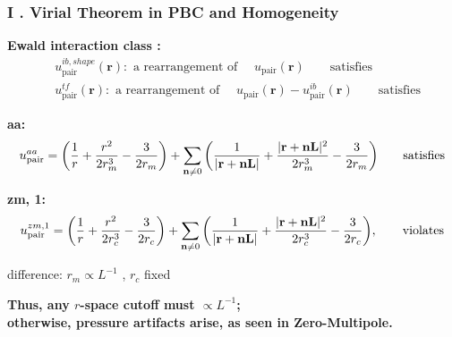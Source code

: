 \documentclass{beamer}
\begin{document}
	\begin{frame}
		\frametitle{I . Virial Theorem in PBC and Homogeneity}    	
		\footnotesize 
		
		\textbf{Ewald interaction class :}
		\begin{align*}
			&u_{\text{pair}}^{ib, shape}(\mathbf{r})  : \text{  a rearrangement of    } \quad   u_{\text{pair}}(\mathbf{r}) \qquad \text{satisfies} \\
			&u_{\text{pair}}^{tf}(\mathbf{r})  : \text{  a rearrangement of    } \quad   u_{\text{pair}}(\mathbf{r}) - u^{ib}_{\text{pair}}(\mathbf{r}) \qquad \text{satisfies}
		\end{align*}
		
		\textbf{aa:}
		\begin{equation*}
			u_{\text{pair}}^{aa} = 
			\bigg{(} \dfrac{1}{r} +  \dfrac{r^2}{2r_m^3} - \dfrac{3}{2r_m}\bigg{)} + \sum_{\mathbf{n} \ne 0 }\bigg{(}\dfrac{1}{|\mathbf{r} + \mathbf{nL}|} +  \dfrac{|\mathbf{r} + \mathbf{nL}|^2}{2r_m^3} - \dfrac{3}{2r_m} \bigg{)} \qquad \text{satisfies}
		\end{equation*}
		
		\textbf{zm, 1:}
		\begin{equation*}
			u_{\text{pair}}^{zm, 1} = 
			\bigg{(} \dfrac{1}{r} +  \dfrac{r^2}{2r_c^3} - \dfrac{3}{2r_c}\bigg{)} + \sum_{\mathbf{n} \ne 0 }\bigg{(}\dfrac{1}{|\mathbf{r} + \mathbf{nL}|} +  \dfrac{|\mathbf{r} + \mathbf{nL}|^2}{2r_c^3} - \dfrac{3}{2r_c} \bigg{)},  \qquad \text{violates}
		\end{equation*}
		
		\begin{center}
			difference: $r_m \propto L^{-1}$ , $r_c$ fixed 
		\end{center}
		
		
		\textbf{Thus, any $r$-space cutoff must $\propto L^{-1}$; \\
			otherwise, pressure artifacts arise, as seen in Zero-Multipole\footnotemark[10] .}
		
	\end{frame}
\end{document}
